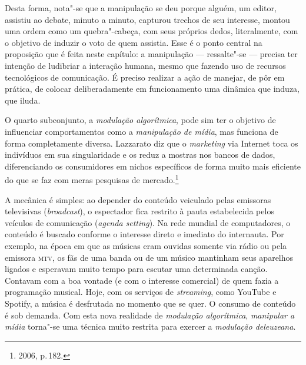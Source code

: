 Desta forma, nota"-se que a manipulação se deu porque alguém, um editor,
assistiu ao debate, minuto a minuto, capturou trechos de seu interesse,
montou uma ordem como um quebra"-cabeça, com seus próprios dedos,
literalmente, com o objetivo de induzir o voto de quem assistia. Esse é
o ponto central na proposição que é feita neste capítulo: a manipulação
--- ressalte"-se --- precisa ter intenção de ludibriar a interação humana,
mesmo que fazendo uso de recursos tecnológicos de comunicação. É preciso
realizar a ação de manejar, de pôr em prática, de colocar
deliberadamente em funcionamento uma dinâmica que induza, que iluda.

O quarto subconjunto, a \emph{modulação algorítmica}, pode sim ter o
objetivo de influenciar comportamentos como a \emph{manipulação de
mídia}, mas funciona de forma completamente diversa. Lazzarato diz que o
\emph{marketing} via Internet toca os indivíduos em sua singularidade e
os reduz a mostras nos bancos de dados, diferenciando os consumidores em
nichos específicos de forma muito mais eficiente do que se faz com meras
pesquisas de mercado.\footnote{2006, p.\,182.}

A mecânica é simples: ao depender do conteúdo veiculado pelas emissoras
televisivas (\emph{broadcast}), o espectador fica restrito à pauta
estabelecida pelos veículos de comunicação (\emph{agenda setting}). Na
rede mundial de computadores, o conteúdo é buscado conforme o interesse
direto e imediato do internauta. Por exemplo, na época em que as músicas
eram ouvidas somente via rádio ou pela emissora \textsc{mtv}, os fãs de uma banda
ou de um músico mantinham seus aparelhos ligados e esperavam muito tempo
para escutar uma determinada canção. Contavam com a boa vontade (e com o
interesse comercial) de quem fazia a programação musical. Hoje, com os
serviços de \emph{streaming}, como YouTube e Spotify, a música é
desfrutada no momento que se quer. O consumo de conteúdo é sob demanda.
Com esta nova realidade de \emph{modulação algorítmica}, \emph{manipular
a mídia} torna"-se uma técnica muito restrita para exercer a
\emph{modulação deleuzeana}.

